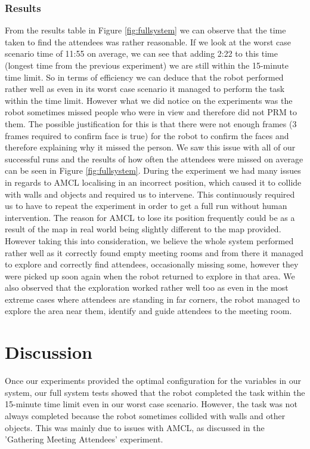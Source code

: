 \documentclass[conference]{IEEEtran}
\begin{document}
\subsubsection{Results}
From the results table  in Figure \ref{fig:fullsystem} we can observe that the time taken to find the attendees was rather reasonable. If we look at the worst case scenario time of 11:55 on average, we can see that adding 2:22 to this time (longest time from the previous experiment) we are still within the 15-minute time limit. So in terms of efficiency we can deduce that the robot performed rather well as even in its worst case scenario it managed to perform the task within the time limit. However what we did notice on the experiments was the robot sometimes missed people who were in view and therefore did not PRM to them. The possible justification for this is that there were not enough frames (3 frames required to confirm face is true) for the robot to confirm the faces and therefore explaining why it missed the person. We saw this issue with all of our successful runs and the results of how often the attendees were missed on average can be seen in  Figure \ref{fig:fullsystem}. During the experiment we had many issues in regards to AMCL localising in an incorrect position, which caused it to collide with walls and objects and required us to intervene. This continuously required us to have to repeat the experiment in order to get a full run without human intervention. The reason for AMCL to lose its position frequently could be as a result of the map in real world being slightly different to the map provided. However taking this into consideration, we believe the whole system performed rather well as it correctly found empty meeting rooms and from there it managed to explore and correctly find attendees, occasionally missing some, however they were picked up soon again when the robot returned to explore in that area. We also observed that the exploration worked rather well too as even in the most extreme cases where attendees are standing in far corners, the robot managed to explore the area near them, identify and guide attendees to the meeting room.

\section{Discussion}
Once our experiments provided the optimal configuration for the variables in our system, our full system tests showed that the robot completed the task within the 15-minute time limit even in our worst case scenario. However, the task was not always completed because the robot sometimes collided with walls and other objects. This was mainly due to issues with AMCL, as discussed in the 'Gathering Meeting Attendees' experiment.
\end{document}
